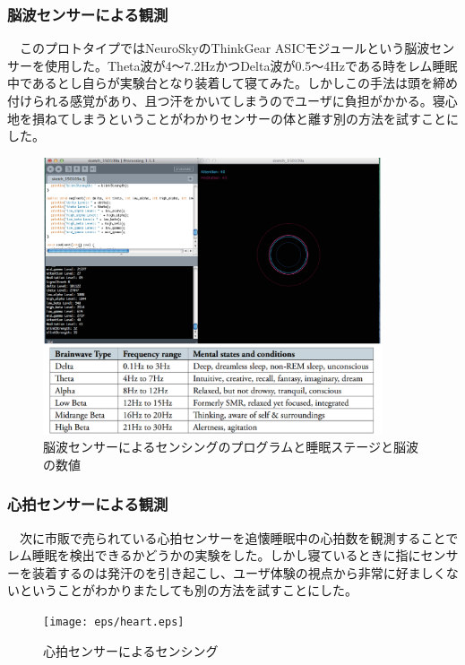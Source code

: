 \subsubsection{脳波センサーによる観測}
　このプロトタイプではNeuroSkyのThinkGear ASICモジュールという脳波センサーを使用した。Theta波が4〜7.2HzかつDelta波が0.5〜4Hzである時をレム睡眠中であるとし自らが実験台となり装着して寝てみた。しかしこの手法は頭を締め付けられる感覚があり、且つ汗をかいてしまうのでユーザに負担がかかる。寝心地を損ねてしまうということがわかりセンサーの体と離す別の方法を試すことにした。
\begin{figure}[htbp]
\begin{center}
\includegraphics[width=10cm]{eps/brainWave.eps}
\caption{脳波センサーによるセンシングのプログラムと睡眠ステージと脳波の数値}
\label{brainWave}
\end{center}
\end{figure}

\subsubsection{心拍センサーによる観測}
　次に市販で売られている心拍センサーを追懐睡眠中の心拍数を観測することでレム睡眠を検出できるかどうかの実験をした。しかし寝ているときに指にセンサーを装着するのは発汗のを引き起こし、ユーザ体験の視点から非常に好ましくないということがわかりまたしても別の方法を試すことにした。

\begin{figure}[htbp]
\begin{center}
\texttt{[image: eps/heart.eps]}
\caption{心拍センサーによるセンシング}
\label{heart}
\end{center}
\end{figure}

